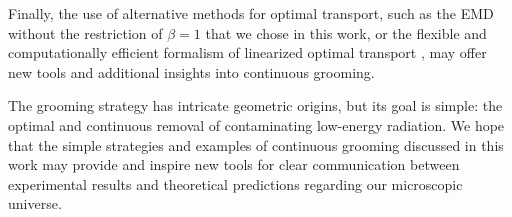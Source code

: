    Finally, the use of alternative methods for optimal transport, such as the EMD without the restriction of \(\beta = 1\) that we chose in this work, or the flexible and computationally efficient formalism of linearized optimal transport \cite{Cai:2020vzx,Cai:2021hnn,cai2022linearized,sarrazin2023linearized}, may offer new tools and additional insights into continuous grooming.

The \PIRANHA{} grooming strategy has intricate geometric origins, but its goal is simple: the optimal and continuous removal of contaminating low-energy radiation.
%
We hope that the simple strategies and examples of continuous grooming discussed in this work may provide and inspire new tools for clear communication between experimental results and theoretical predictions regarding our microscopic universe.







